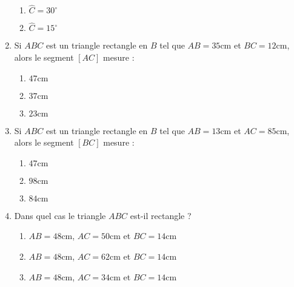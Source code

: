 \documentclass[oneside,twoside]{book}
\begin{document}
\begin{enumerate}
\begin{enumerate}
\item\BonneReponse $\widehat{C}=30^{\circ}$
\item\MauvaiseReponse $\widehat{C}=15^{\circ}$


\end{enumerate}



\item Si $ABC$ est un triangle rectangle en $B$ tel que $AB=35\mathrm{cm}$ et $BC=12\mathrm{cm}$, alors le segment $\left[AC\right]$ mesure :

\begin{enumerate}


\item\MauvaiseReponse $47\mathrm{cm}$

\item\BonneReponse $37\mathrm{cm}$
\item\MauvaiseReponse $23\mathrm{cm}$

\end{enumerate}



\item Si $ABC$ est un triangle rectangle en $B$ tel que $AB=13\mathrm{cm}$ et $AC=85\mathrm{cm}$, alors le segment $\left[BC\right]$ mesure :

\begin{enumerate}


\item\MauvaiseReponse $47\mathrm{cm}$

\item\MauvaiseReponse $98\mathrm{cm}$
\item\BonneReponse $84\mathrm{cm}$

\end{enumerate}

\newpage

\item Dans quel cas le triangle $ABC$ est-il rectangle ?

\begin{enumerate}

\item\BonneReponse $AB=48\mathrm{cm}$, $AC=50\mathrm{cm}$ et $BC=14\mathrm{cm}$

\item\MauvaiseReponse $AB=48\mathrm{cm}$, $AC=62\mathrm{cm}$ et $BC=14\mathrm{cm}$

\item\MauvaiseReponse $AB=48\mathrm{cm}$, $AC=34\mathrm{cm}$ et $BC=14\mathrm{cm}$


\end{enumerate}
\end{enumerate}
\end{document}
